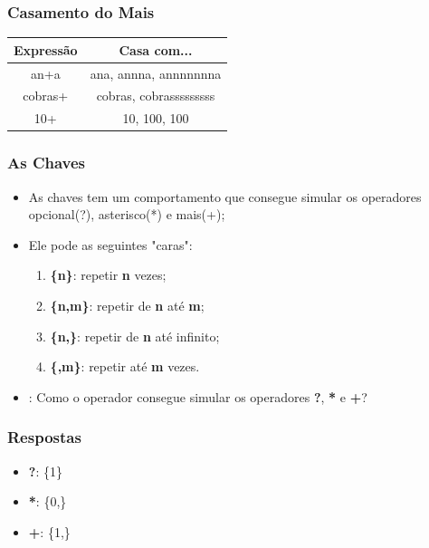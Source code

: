 \begin{frame}
	\frametitle{Casamento do Mais}
	\begin{center}
	\begin{tabular}{c|c}
		\textbf{Expressão} & \textbf{Casa com...} \\ \hline
		an+a		& ana, annna, annnnnnna \\ \hline
		cobras+		& cobras, cobrasssssssss \\ \hline
		10+		& 10, 100, 100		\\ \hline
	\end{tabular}
	\end{center}
\end{frame}


\begin{frame}

	\frametitle{As Chaves}
	\begin{itemize}
		\item As chaves tem um comportamento que consegue simular os operadores opcional(?), asterisco(*) e mais(+);
		\item Ele pode as seguintes "caras":
		\begin{enumerate}
			\item \textbf{\{n\}}: repetir \textbf{n} vezes;
			\item \textbf{\{n,m\}}: repetir de \textbf{n} até \textbf{m};
			\item \textbf{\{n,\}}: repetir de \textbf{n} até infinito;
			\item \textbf{\{,m\}}: repetir até \textbf{m} vezes.
		\end{enumerate}
		\item {}: Como o operador consegue simular os operadores \textbf{?}, \textbf{*} e \textbf{+}?
	\end{itemize}
\end{frame}

\begin{frame}
	\frametitle{Respostas}
	\begin{itemize}
		\item \textbf{?}: \{1\}
		\item \textbf{*}: \{0,\}
		\item \textbf{+}: \{1,\}
	\end{itemize}
\end{frame}

